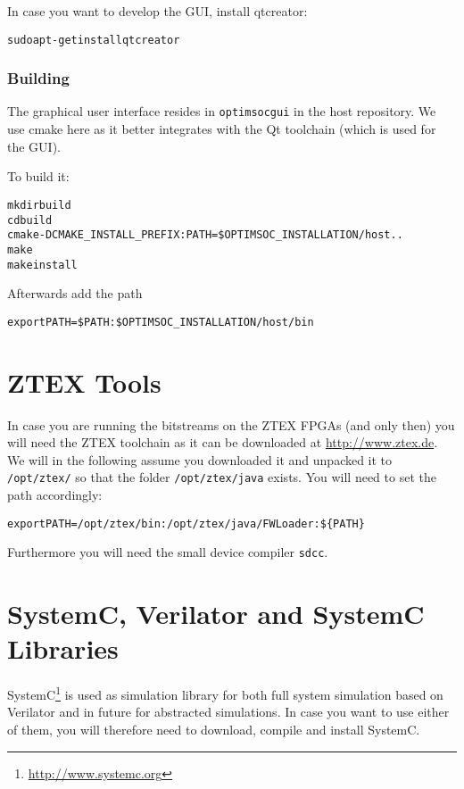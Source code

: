 In case you want to develop the GUI, install qtcreator:

\begin{alltt}
sudo apt-get install qtcreator
\end{alltt}

\subsubsection{Building}

The graphical user interface resides in \verb|optimsocgui| in the host
repository. We use cmake here as it better integrates with the Qt
toolchain (which is used for the GUI).

To build it:

\begin{alltt}
mkdir build
cd build
cmake -DCMAKE_INSTALL_PREFIX:PATH=\$OPTIMSOC_INSTALLATION/host ..
make
make install
\end{alltt}

Afterwards add the path

\begin{alltt}
export PATH=\$PATH:\$OPTIMSOC_INSTALLATION/host/bin
\end{alltt}

\section{ZTEX Tools}

In case you are running the bitstreams on the ZTEX FPGAs (and only
then) you will need the ZTEX toolchain as it can be downloaded at
\url{http://www.ztex.de}. We will in the following assume you
downloaded it and unpacked it to \verb|/opt/ztex/| so that the folder
\verb|/opt/ztex/java| exists. You will need to set the path
accordingly:

\begin{alltt}
export PATH=/opt/ztex/bin:/opt/ztex/java/FWLoader:\$\{PATH\}
\end{alltt}

Furthermore you will need the small device compiler \verb|sdcc|.

\section{SystemC, Verilator and SystemC Libraries}

SystemC\footnote{\url{http://www.systemc.org}} is used as simulation
library for both full system simulation based on Verilator and in
future for abstracted simulations. In case you want to use either of
them, you will therefore need to download, compile and install
SystemC.

